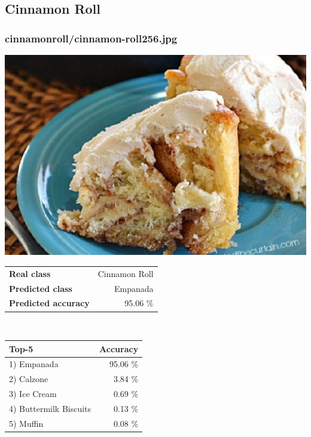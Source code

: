 \subsection{Cinnamon Roll}
    
\subsubsection{cinnamon\textunderscore roll/cinnamon-roll256.jpg}

\begin{minipage}[t]{0.4\textwidth}
	\vspace{0pt}
	\includegraphics[width=\linewidth]{images/evaluation-images/cinnamon_roll/cinnamon-roll256.jpg}
\end{minipage}
\hfill
\begin{minipage}[t]{0.5\textwidth}
	\vspace{0pt}\raggedright
	\begin{tabularx}{\textwidth}{X r}
		\small \textbf{Real class} & \small Cinnamon Roll\\
		\small \textbf{Predicted class} & \small Empanada\\
		\small \textbf{Predicted accuracy} & \small 95.06 \%
    \end{tabularx}\\
    
    \vspace{6pt}
	\begin{tabularx}{\textwidth}{X r}
        \small \textbf{Top-5} & \small \textbf{Accuracy} \\
        \hline
		\small 1) Empanada & \small 95.06 \%\\\small 2) Calzone & \small 3.84 \%\\\small 3) Ice Cream & \small 0.69 \%\\\small 4) Buttermilk Biscuits & \small 0.13 \%\\\small 5) Muffin & \small 0.08 \%
    \end{tabularx}
\end{minipage}
    
